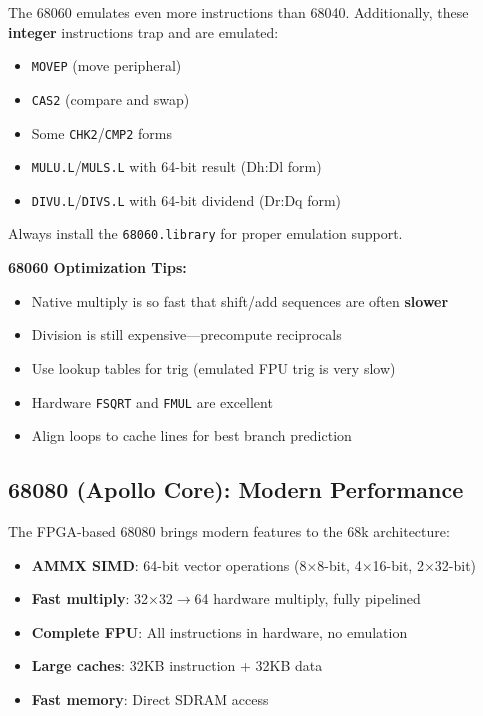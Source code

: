 \begin{warningbox}
The 68060 emulates even more instructions than 68040. Additionally, these \textbf{integer} instructions trap and are emulated:
\begin{itemize}
\item \texttt{MOVEP} (move peripheral)
\item \texttt{CAS2} (compare and swap)
\item Some \texttt{CHK2}/\texttt{CMP2} forms
\item \texttt{MULU.L}/\texttt{MULS.L} with 64-bit result (Dh:Dl form)
\item \texttt{DIVU.L}/\texttt{DIVS.L} with 64-bit dividend (Dr:Dq form)
\end{itemize}

Always install the \texttt{68060.library} for proper emulation support.
\end{warningbox}

\textbf{68060 Optimization Tips:}
\begin{itemize}
\item Native multiply is so fast that shift/add sequences are often \textbf{slower}
\item Division is still expensive---precompute reciprocals
\item Use lookup tables for trig (emulated FPU trig is very slow)
\item Hardware \texttt{FSQRT} and \texttt{FMUL} are excellent
\item Align loops to cache lines for best branch prediction
\end{itemize}

\subsection{68080 (Apollo Core): Modern Performance}

The FPGA-based 68080 brings modern features to the 68k architecture:

\begin{itemize}
\item \textbf{AMMX SIMD}: 64-bit vector operations (8$\times$8-bit, 4$\times$16-bit, 2$\times$32-bit)
\item \textbf{Fast multiply}: 32$\times$32$\rightarrow$64 hardware multiply, fully pipelined
\item \textbf{Complete FPU}: All instructions in hardware, no emulation
\item \textbf{Large caches}: 32KB instruction + 32KB data
\item \textbf{Fast memory}: Direct SDRAM access
\end{itemize}

